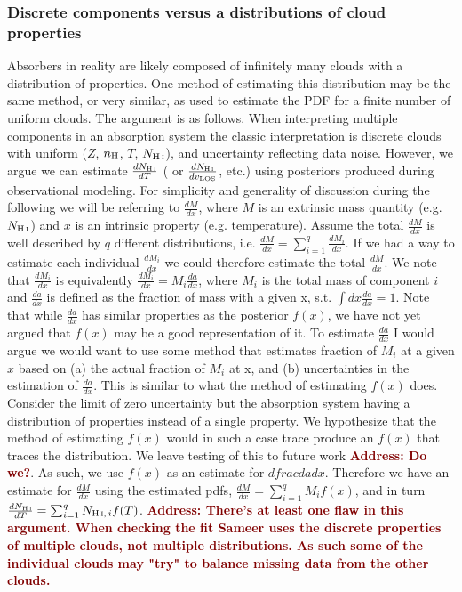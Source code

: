 \documentclass[fleqn,usenatbib]{mnras}
\newcommand{\todo}[1]{\textcolor{Maroon}{\textbf{Address: #1}}}
\newcommand{\NHI}{N_{\ion{H}{I}}}
\begin{document}
\subsubsection{Discrete components versus a distributions of cloud properties}

Absorbers in reality are likely composed of infinitely many clouds with a distribution of properties.
One method of estimating this distribution may be the same method, or very similar, as used to estimate the PDF for a finite number of uniform clouds.
The argument is as follows.
When interpreting multiple components in an absorption system the classic interpretation is discrete clouds with uniform ($Z$, $n_{\rm H}$, $T$, $\NHI$), and uncertainty reflecting data noise.
However, we argue we can estimate $\frac{d\NHI}{dT}$ ( or $\frac{d\NHI}{dv_{\rm LOS}}$, etc.) using posteriors produced during observational modeling.
For simplicity and generality of discussion during the following we will be referring to $\frac{dM}{dx}$, where $M$ is an extrinsic mass quantity (e.g. $\NHI$) and $x$ is an intrinsic property (e.g. temperature).
Assume the total $\frac{dM}{dx}$ is well described by $q$ different distributions, i.e. $\frac{dM}{dx} = \sum_{i=1}^{q} \frac{dM_i}{dx}$.
If we had a way to estimate each individual $\frac{dM_i}{dx}$ we could therefore estimate the total $\frac{dM}{dx}$.
We note that $\frac{dM_i}{dx}$ is equivalently $\frac{dM_i}{dx} = M_i \frac{da}{dx}$, where $M_i$ is the total mass of component $i$ and $\frac{da}{dx}$ is defined as the fraction of mass with a given x, s.t. $\int dx \frac{da}{dx} = 1$.
Note that while $\frac{da}{dx}$ has similar properties as the posterior $f(x)$, we have not yet argued that $f(x)$ may be a good representation of it.
To estimate $\frac{da}{dx}$ I would argue we would want to use some method that estimates fraction of $M_i$ at a given $x$ based on
(a) the actual fraction of $M_i$ at x, and
(b) uncertainties in the estimation of $\frac{da}{dx}$.
This is similar to what the method of estimating $f(x)$ does.
Consider the limit of zero uncertainty but the absorption system having a distribution of properties instead of a single property.
We hypothesize that the method of estimating $f(x)$ would in such a case trace produce an $f(x)$ that traces the distribution.
We leave testing of this to future work \todo{Do we?}.
As such, we use $f(x)$ as an estimate for $dfrac{da}{dx}$. Therefore we have an estimate for $\frac{dM}{dx}$ using the estimated pdfs,
$\frac{dM}{dx} = \sum_{i=1}^{q} M_i f(x)$, and in turn $\frac{d\NHI}{dT} = \sum_{i=1}^{q} N_{\ion{H}{I},\,i} f(T)$.
\todo{There's at least one flaw in this argument.
When checking the fit Sameer uses the discrete properties of multiple clouds, not multiple distributions.
As such some of the individual clouds may "try" to balance missing data from the other clouds.}
\end{document}
